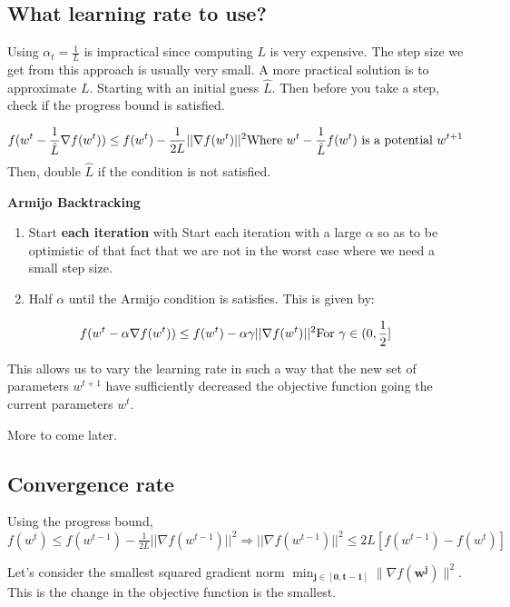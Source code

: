 \documentclass[
]{article}
\begin{document}
\subsection{What learning rate to use?}\label{what-learning-rate-to-use}

Using \(\alpha_t = \frac{1}{L}\) is impractical since computing \(L\) is very expensive. The step size we get from this approach is usually very small. A more practical solution is to approximate \(L\). Starting with an initial guess \(\hat{L}\). Then before you take a step, check if the progress bound is satisfied.

\[
f(w^t -\frac{1}{\hat{L}} \nabla f(w^{t})) \le f(w^{t}) - \frac{1}{2L} ||\nabla f(w^{t})||^2\\
\text{Where } w^t -\frac{1}{\hat{L}} f(w^{t}) \text{ is a potential } w^{t+1}
\]
Then, double \(\hat{L}\) if the condition is not satisfied.

\textbf{Armijo Backtracking}

\begin{enumerate}
\def\labelenumi{\arabic{enumi}.}
\item
  Start \textbf{each iteration} with Start each iteration with a large \(\alpha\) so as to be optimistic of that fact that we are not in the worst case where we need a small step size.
\item
  Half \(\alpha\) until the Armijo condition is satisfies. This is given by:
\end{enumerate}

\[
f(w^t - \alpha \nabla f(w^{t})) \le f(w^t) - \alpha \gamma ||\nabla f(w^t)||^2 \\
\text{For } \gamma \in (0, \frac{1}{2}]
\]

This allows us to vary the learning rate in such a way that the new set of parameters \(w^{t+1}\) have sufficiently decreased the objective function going the current parameters \(w^t\).

More to come later.

\subsection{Convergence rate}\label{convergence-rate}

Using the progress bound, \(f(w^t) \le f(w^{t-1}) - \frac{1}{2L} ||\nabla f(w^{t-1})||^2 \Longrightarrow ||\nabla f(w^{t-1})||^2 \le 2L[f(w^{t-1}) - f(w^t)]\)

Let's consider the smallest squared gradient norm \(\min_{\mathbf{j \in {[0, t-1]}}} \|\nabla f(\mathbf{w^j})\|^2\). This is the change in the objective function is the smallest.
\end{document}
